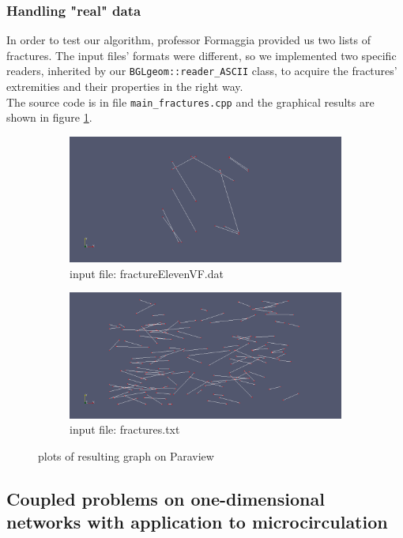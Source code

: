 \documentclass[10pt]{article} %
\begin{document}
	\subsubsection{Handling "real" data}
	In order to test our algorithm, professor Formaggia provided us two lists of fractures. The input files' formats were different, so we implemented two specific readers, inherited by our \texttt{BGLgeom::reader\_ASCII} class, to acquire the fractures' extremities and their properties in the right way. \\
	The source code is in file \texttt{main\_fractures.cpp} and the graphical results are shown in figure \ref{fig:plots_real_fractures}.
	\begin{figure}
		\centering
		\begin{subfigure}{.5\textwidth}
			\centering
			\includegraphics[width=.9\linewidth]{graph1}
			\caption*{input file: fractureElevenVF.dat}
		\end{subfigure}%
		\begin{subfigure}{.5\textwidth}
			\centering
			\includegraphics[width=.9\linewidth]{graph2}
			\caption*{input file: fractures.txt}
		\end{subfigure}
		\caption{plots of resulting graph on Paraview}
		\label{fig:plots_real_fractures}
	\end{figure}
	
	\subsection{Coupled problems on one-dimensional networks with application to microcirculation}
	
\end{document}
